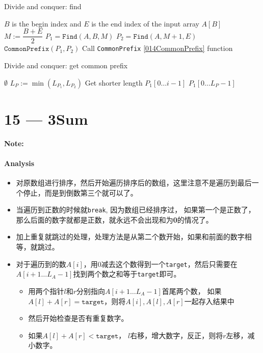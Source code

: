 \documentclass[a4paper,12pt]{article}
\begin{document}
\begin{algorithm}[H]
\caption{Divide and conquer: find}
\label{014Find}
\begin{algorithmic}[1]
\Statex
{}  \Comment $B$ is the begin index and $E$ is the end index of the input array
\State \Return $A[B]$
\EndIf
\State $M:=\dfrac{B+E}{2}$
\State $P_{1} = \mathtt{Find}(A, B, M)$
\State $P_{2} = \mathtt{Find}(A, M+1, E)$
\State \Return $\mathtt{CommonPrefix}(P_{1}, P_{2})$ \Comment Call \texttt{CommonPrefix} \ref{014CommonPrefix} function
\EndProcedure
\Statex
\end{algorithmic}
\end{algorithm}

\begin{algorithm}[H]
\caption{Divide and conquer: get common prefix}
\label{014CommonPrefix}
\begin{algorithmic}[1]
\Statex
{}  
\Return $\emptyset$
\EndIf
\State $L_{P}:= \min(L_{P_{1}}, L_{P_{2}})$ \Comment Get shorter length
\State \Return $P_1[0\ldots i-1]$ 
\EndIf
\State \Return $P_1[0\ldots L_{P}-1]$ 
\EndFor
\EndProcedure
\Statex
\end{algorithmic}
\end{algorithm}

\section{15 --- 3Sum}
\textbf{\large{Note:}}
\paragraph{Analysis}
\begin{CJK*}{UTF8}{gbsn}
\begin{itemize}
\item 对原数组进行排序，然后开始遍历排序后的数组，这里注意不是遍历到最后一个停止，而是到倒数第三个就可以了。
\item 当遍历到正数的时候就\texttt{break}, 因为数组已经排序过， 如果第一个是正数了，那么后面的数字就都是正数，就永远不会出现和为\textbf{0}的情况了。
\item 加上重复就跳过的处理，处理方法是从第二个数开始，如果和前面的数字相等，就跳过。
\item 对于遍历到的数$A[i]$，用0减去这个数得到一个\texttt{target}，然后只需要在$A[i+1\ldots L_{A}-1]$找到两个数之和等于\texttt{target}即可。
\begin{itemize}
\item 用两个指针$l$和$r$分别指向$A[i+1\ldots L_{A}-1]$首尾两个数， 如果$A[l]+A[r] = \mathtt{target}$，则将$A[i], A[l], A[r]$一起存入结果中
\item 然后开始检查是否有重复数字。
\item 如果$A[l]+A[r] < \mathtt{target}$， $l$右移，增大数字，反正，则将$r$左移，减小数字。
\end{itemize}
\end{itemize}
\clearpage
\end{CJK*}
\end{document}
